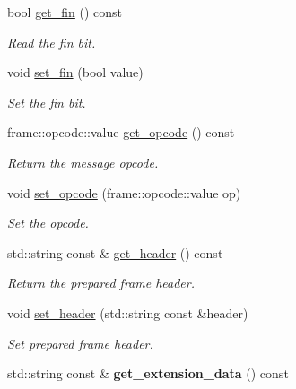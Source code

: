 \begin{DoxyCompactItemize}
bool \hyperlink{classwebsocketpp_1_1message__buffer_1_1message_a8546e56c8a4c6d7f9f37510183874fba}{get\+\_\+fin} () const
\begin{DoxyCompactList}\small\item\em Read the fin bit. \end{DoxyCompactList}\item 
void \hyperlink{classwebsocketpp_1_1message__buffer_1_1message_ae726efab2bc95acf7a1fcd327a8e85b9}{set\+\_\+fin} (bool value)
\begin{DoxyCompactList}\small\item\em Set the fin bit. \end{DoxyCompactList}\item 
frame\+::opcode\+::value \hyperlink{classwebsocketpp_1_1message__buffer_1_1message_aa8f82b2e145e1d52ce4a537c3df40389}{get\+\_\+opcode} () const\hypertarget{classwebsocketpp_1_1message__buffer_1_1message_aa8f82b2e145e1d52ce4a537c3df40389}{}\label{classwebsocketpp_1_1message__buffer_1_1message_aa8f82b2e145e1d52ce4a537c3df40389}

\begin{DoxyCompactList}\small\item\em Return the message opcode. \end{DoxyCompactList}\item 
void \hyperlink{classwebsocketpp_1_1message__buffer_1_1message_a96571972bb7dfaf1ffcae2fbedb07bbe}{set\+\_\+opcode} (frame\+::opcode\+::value op)\hypertarget{classwebsocketpp_1_1message__buffer_1_1message_a96571972bb7dfaf1ffcae2fbedb07bbe}{}\label{classwebsocketpp_1_1message__buffer_1_1message_a96571972bb7dfaf1ffcae2fbedb07bbe}

\begin{DoxyCompactList}\small\item\em Set the opcode. \end{DoxyCompactList}\item 
std\+::string const  \& \hyperlink{classwebsocketpp_1_1message__buffer_1_1message_a020b849ba700f5fefebb2f461a97505e}{get\+\_\+header} () const
\begin{DoxyCompactList}\small\item\em Return the prepared frame header. \end{DoxyCompactList}\item 
void \hyperlink{classwebsocketpp_1_1message__buffer_1_1message_a230b36c0cd2572cfce1f218a15bc534e}{set\+\_\+header} (std\+::string const \&header)
\begin{DoxyCompactList}\small\item\em Set prepared frame header. \end{DoxyCompactList}\item 
std\+::string const  \& {\bfseries get\+\_\+extension\+\_\+data} () const\hypertarget{classwebsocketpp_1_1message__buffer_1_1message_a8473c7254d7a8aba0d2840c474234fdc}{}\label{classwebsocketpp_1_1message__buffer_1_1message_a8473c7254d7a8aba0d2840c474234fdc}


\end{DoxyCompactItemize}
